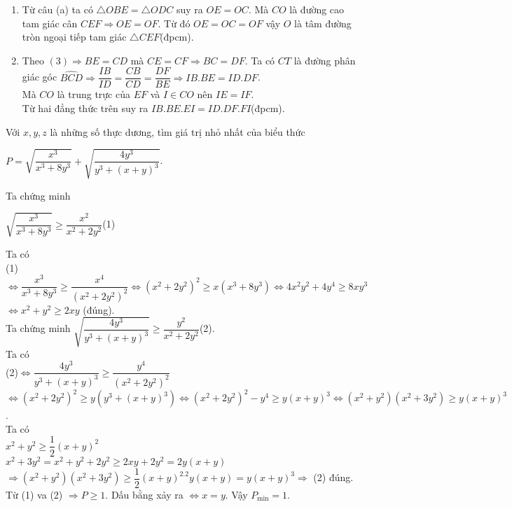 \begin{ex}
{\begin{enumerate}
		 Từ $(1),(2),(3)$ suy ra $\triangle OBE=\triangle ODC$(c-g-c)(dpcm).
		\item Từ câu (a) ta có $\triangle OBE=\triangle ODC$ suy ra $OE=OC$. Mà $CO$ là đường cao tam giác cân $CEF\Rightarrow OE=OF$. Từ đó $OE=OC=OF$ vậy $O$ là tâm đường tròn ngoại tiếp tam giác $\triangle CEF$(đpcm).
		\item Theo $(3)\Rightarrow BE=CD$ mà $CE=CF\Rightarrow BC=DF$. Ta có $CT$ là đường phân giác góc $\widehat{BCD}\Rightarrow\dfrac{IB}{ID}=\dfrac{CB}{CD}=\dfrac{DF}{BE}\Rightarrow IB.BE=ID.DF$.\\
		Mà $CO$ là trung trực của $EF$ và $I\in CO$ nên $IE=IF$.\\
		Từ hai đẳng thức trên suy ra $IB.BE.EI=ID.DF.FI$(đpcm).
	\end{enumerate}	
	}
\end{ex}
\begin{ex}%
	Với $x,y,z$ là những số thực dương, tìm giá trị nhỏ nhất của biểu thức
	\begin{center}
		$P=\sqrt{\dfrac{x^3}{x^3+8y^3}}+\sqrt{\dfrac{4y^3}{y^3+(x+y)^3}}$.
	\end{center}
	\loigiai
	{
		Ta chứng minh
		\begin{center}
			$\sqrt{\dfrac{x^3}{x^3+8y^3}}\geq \dfrac{x^2}{x^2+2y^2}$\hfill(1)
		\end{center}
		Ta có\\ (1)$\Leftrightarrow\dfrac{x^3}{x^3+8y^3}\geq \dfrac{x^4}{(x^2+2y^2)^2}\Leftrightarrow(x^2+2y^2)^2\geq x(x^3+8y^3)\Leftrightarrow 4x^2y^2+4y^4\geq 8xy^3$\\
		$\Leftrightarrow x^2+y^2\geq 2xy$ (đúng).\\
		Ta chứng minh $\sqrt{\dfrac{4y^3}{y^3+(x+y)^3}}\geq \dfrac{y^2}{x^2+2y^2}$\hfill(2).\\
		Ta có\\
		(2)$\Leftrightarrow \dfrac{4y^3}{y^3+(x+y)^3}\geq\dfrac{y^4}{(x^2+2y^2)^2}$\\
		$\Leftrightarrow (x^2+2y^2)^2\geq y\left( y^3+(x+y)^3\right) \Leftrightarrow (x^2+2y^2)^2-y^4\geq y(x+y)^3\Leftrightarrow (x^2+y^2)(x^2+3y^2)\geq y(x+y)^3$.\\
		Ta có\\
		$x^2+y^2\geq \dfrac{1}{2}(x+y)^2$\\
		$x^2+3y^2=x^2+y^2+2y^2\geq 2xy+2y^2=2y(x+y)$\\
		$\Rightarrow (x^2+y^2)(x^2+3y^2)\geq \dfrac{1}{2}(x+y)^2.2y(x+y)=y(x+y)^3\Rightarrow$ (2) đúng.\\
		Từ (1) va (2) $\Rightarrow P\geq 1$. Dấu bằng xảy ra $\Leftrightarrow x=y$. Vậy $P_{\min} =1$.
	}
\end{ex}
